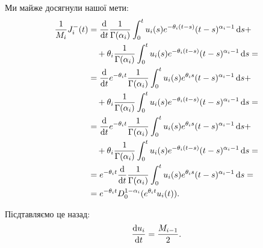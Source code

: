 Ми майже досягнули нашої мети:
\begin{equation}
    \begin{aligned}
        \frac{1}{M_i} J_i^-(t)
        &= \frac{\diff}{\diff t} \frac{1}{\Gamma(\alpha_i)} \int_0^t u_i(s) e^{-\theta_i (t - s)} (t - s)^{\alpha_i - 1} \diff s + \\
        &\quad + \theta_i \frac{1}{\Gamma(\alpha_i)} \int_0^t u_i(s) e^{-\theta_i (t - s)} (t - s)^{\alpha_i - 1} \diff s = \\
        &= \frac{\diff}{\diff t} e^{-\theta_i t} \frac{1}{\Gamma(\alpha_i)} \int_0^t u_i(s) e^{\theta_i s} (t - s)^{\alpha_i - 1} \diff s + \\
        &\quad + \theta_i \frac{1}{\Gamma(\alpha_i)} \int_0^t u_i(s) e^{-\theta_i (t - s)} (t - s)^{\alpha_i - 1} \diff s = \\
        &= \frac{\diff}{\diff t} e^{-\theta_i t} \frac{1}{\Gamma(\alpha_i)} \int_0^t u_i(s) e^{\theta_i s} (t - s)^{\alpha_i - 1} \diff s + \\
        &\quad + \theta_i \frac{1}{\Gamma(\alpha_i)} \int_0^t u_i(s) e^{-\theta_i (t - s)} (t - s)^{\alpha_i - 1} \diff s = \\
        &= e^{-\theta_i t} \frac{\diff}{\diff t} \frac{1}{\Gamma(\alpha_i)} \int_0^t u_i(s) e^{\theta_i s} (t - s)^{\alpha_i - 1} \diff s = \\
        &= e^{-\theta_i t} D_0^{1 - \alpha_i} (e^{\theta_i t} u_i(t)).
    \end{aligned}
\end{equation}

Пісдтавляємо це назад:
\begin{equation}
    \frac{\mathop{}\!\mathrm{d} u_i}{\mathop{}\!\mathrm{d} t} = \frac{M_{i - 1}}{2}.    
\end{equation}
